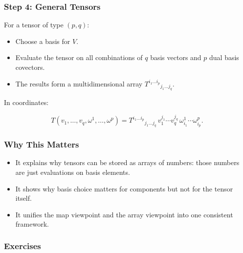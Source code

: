 \documentclass[
  letterpaper,
  DIV=11,
  numbers=noendperiod]{scrreprt}
\providecommand{\tightlist}{%
  \setlength{\itemsep}{0pt}\setlength{\parskip}{0pt}}
\begin{document}
\subsubsection{Step 4: General Tensors}\label{step-4-general-tensors}

For a tensor of type \((p,q)\):

\begin{itemize}
\tightlist
\item
  Choose a basis for \(V\).
\item
  Evaluate the tensor on all combinations of \(q\) basis vectors and
  \(p\) dual basis covectors.
\item
  The results form a multidimensional array
  \(T^{i_1 \dots i_p}{}_{j_1 \dots j_q}\).
\end{itemize}

In coordinates:

\[
T(v_1, \dots, v_q, \omega^1, \dots, \omega^p) =
T^{i_1 \dots i_p}{}_{j_1 \dots j_q}
\, v_1^{j_1} \cdots v_q^{j_q} \, \omega^1_{i_1} \cdots \omega^p_{i_p}.
\]

\subsubsection{Why This Matters}\label{why-this-matters-6}

\begin{itemize}
\tightlist
\item
  It explains why tensors can be stored as arrays of numbers: those
  numbers are just evaluations on basis elements.
\item
  It shows why basis choice matters for components but not for the
  tensor itself.
\item
  It unifies the map viewpoint and the array viewpoint into one
  consistent framework.
\end{itemize}

\subsubsection{Exercises}\label{exercises-14}
\end{document}
